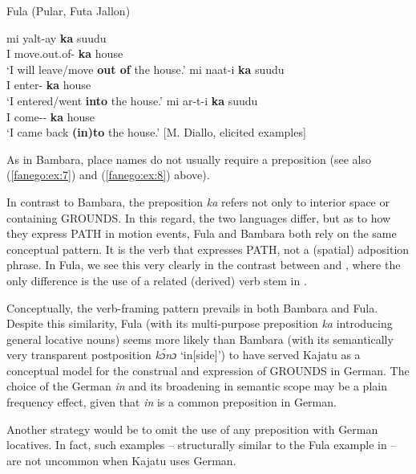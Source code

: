 \documentclass[output=paper]{langscibook}
\begin{document}
\begin{exe}
    \ex\label{fanego:ex:11} Fula (Pular, Futa Jallon)
    \begin{xlist}
        \ex\label{fanego:ex:11a} 
        \gll mi yalt-ay \textbf{ka} suudu \\
        I move.out.of-\IPFV{} \textbf{ka} house \\
        \glt ‘I will leave/move \textbf{out of} the house.’
        \ex\label{fanego:ex:11b} 
        \gll mi naat-i \textbf{ka} suudu	\\
        I enter-\PFV{} \textbf{ka} house \\
        \glt ‘I entered/went \textbf{into} the house.’
        \ex\label{11c} 
        \gll mi ar-t-i \textbf{ka} suudu \\
        I come-\REV-\PFV{} \textbf{ka}	house \\
        \glt ‘I came back \textbf{(in)to} the house.’ [M. Diallo, elicited examples]
    \end{xlist}
\end{exe}

\noindent
As in Bambara, place names do not usually require a preposition (see also (\ref{fanego:ex:7}) and (\ref{fanego:ex:8}) above). 

In contrast to Bambara, the preposition \textit{ka} refers not only to interior space or containing GROUNDS. In this regard, the two languages differ, but as to how they express PATH in motion events, Fula and Bambara both rely on the same conceptual pattern. It is the verb that expresses PATH, not a (spatial) adposition phrase. In Fula, we see this very clearly in the contrast between  and , where the only difference is the use of a related (derived) verb stem in . 

Conceptually, the verb-framing pattern prevails in both Bambara and Fula. Despite this similarity, Fula (with its multi-purpose preposition \textit{ka} introducing general locative nouns) seems more likely than Bambara (with its semantically very transparent postposition \textit{kɔ́nɔ} ‘in[side]’) to have served Kajatu as a conceptual model for the construal and expression of GROUNDS in German. The choice of the German \textit{in} and its broadening in semantic scope may be a plain frequency effect, given that \textit{in} is a common preposition in German. 

Another strategy would be to omit the use of any preposition with German locatives. In fact, such examples – structurally similar to the Fula example in  – are not uncommon when Kajatu uses German. 
\end{document}
